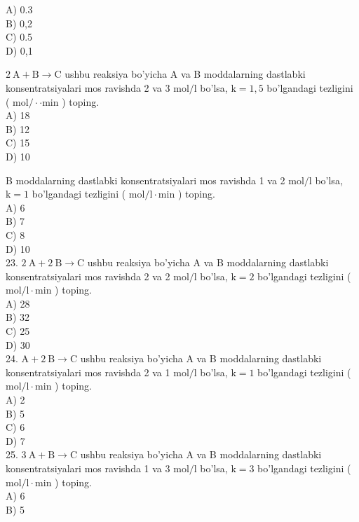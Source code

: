 A) 0.3\\
B) 0,2\\
C) 0.5\\
D) 0,1
  \item $2 \mathrm{~A}+\mathrm{B} \rightarrow \mathrm{C}$ ushbu reaksiya bo'yicha A va B moddalarning dastlabki konsentratsiyalari mos ravishda 2 va 3 $\mathrm{mol} / \mathrm{l}$ bo'lsa, $\mathrm{k}=1,5$ bo'lgandagi tezligini ( $\mathrm{mol} / \cdot \cdot \mathrm{min}$ ) toping.\\
A) 18\\
B) 12\\
C) 15\\
D) 10\\
\item B moddalarning dastlabki konsentratsiyalari mos ravishda 1 va 2 $\mathrm{mol} / \mathrm{l}$ bo'lsa, $\mathrm{k}=1$ bo'lgandagi tezligini ( $\mathrm{mol} / \mathrm{l} \cdot \mathrm{min}$ ) toping.\\
A) 6\\
B) 7\\
C) 8\\
D) 10\\
23. $2 \mathrm{~A}+2 \mathrm{~B} \rightarrow \mathrm{C}$ ushbu reaksiya bo'yicha A va B moddalarning dastlabki konsentratsiyalari mos ravishda 2 va 2 $\mathrm{mol} / \mathrm{l}$ bo'lsa, $\mathrm{k}=2$ bo'lgandagi tezligini ( $\mathrm{mol} / \mathrm{l} \cdot \mathrm{min}$ ) toping.\\
A) 28\\
B) 32\\
C) 25\\
D) 30\\
24. $\mathrm{A}+2 \mathrm{~B} \rightarrow \mathrm{C}$ ushbu reaksiya bo'yicha A va B moddalarning dastlabki konsentratsiyalari mos ravishda 2 va 1 $\mathrm{mol} / \mathrm{l}$ bo'lsa, $\mathrm{k}=1$ bo'lgandagi tezligini ( $\mathrm{mol} / \mathrm{l} \cdot \mathrm{min}$ ) toping.\\
A) 2\\
B) 5\\
C) 6\\
D) 7\\
25. $3 \mathrm{~A}+\mathrm{B} \rightarrow \mathrm{C}$ ushbu reaksiya bo'yicha A va B moddalarning dastlabki konsentratsiyalari mos ravishda 1 va 3 $\mathrm{mol} / \mathrm{l}$ bo'lsa, $\mathrm{k}=3$ bo'lgandagi tezligini ( $\mathrm{mol} / \mathrm{l} \cdot \mathrm{min}$ ) toping.\\
A) 6\\
B) 5\\
